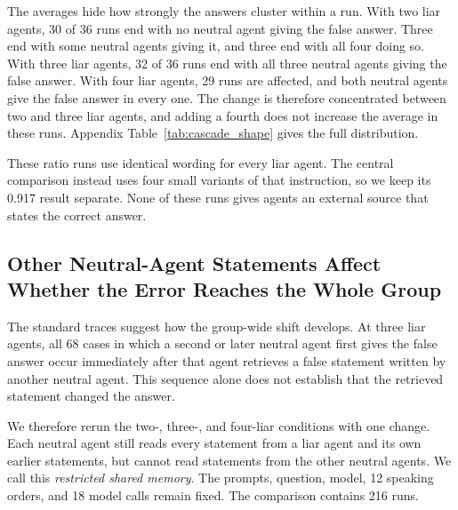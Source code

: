 \documentclass{article} %
\begin{document}
The averages hide how strongly the answers cluster within a run. With two liar agents, 30 of 36 runs end with no neutral agent giving the false answer. Three end with some neutral agents giving it, and three end with all four doing so. With three liar agents, 32 of 36 runs end with all three neutral agents giving the false answer. With four liar agents, 29 runs are affected, and both neutral agents give the false answer in every one. The change is therefore concentrated between two and three liar agents, and adding a fourth does not increase the average in these runs. Appendix Table~\ref{tab:cascade_shape} gives the full distribution.

These ratio runs use identical wording for every liar agent. The central comparison instead uses four small variants of that instruction, so we keep its 0.917 result separate. None of these runs gives agents an external source that states the correct answer.

\subsection{Other Neutral-Agent Statements Affect Whether the Error Reaches the Whole Group}
\label{sec:peer_amplification}

The standard traces suggest how the group-wide shift develops. At three liar agents, all 68 cases in which a second or later neutral agent first gives the false answer occur immediately after that agent retrieves a false statement written by another neutral agent. This sequence alone does not establish that the retrieved statement changed the answer.

We therefore rerun the two-, three-, and four-liar conditions with one change. Each neutral agent still reads every statement from a liar agent and its own earlier statements, but cannot read statements from the other neutral agents. We call this \emph{restricted shared memory}. The prompts, question, model, 12 speaking orders, and 18 model calls remain fixed. The comparison contains 216 runs.
\end{document}
